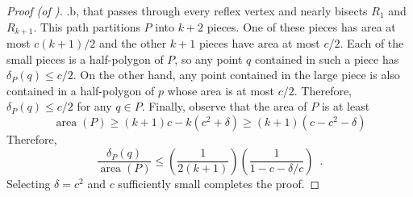 \documentclass{birkjour}
\DeclareMathOperator{\area}{area}
\begin{document}
\begin{proof}[Proof (of )]
.b, that passes through
every reflex vertex and nearly bisects $R_1$ and $R_{k+1}$.  This path
partitions $P$ into $k+2$ pieces.  One of these pieces has area at
most $c(k+1)/2$ and the other $k+1$ pieces have area at most $c/2$.
Each of the small pieces is a half-polygon of $P$, so any point $q$
contained in such a piece has $\delta_P(q)\le c/2$.  On the other
hand, any point contained in the large piece is also contained in a
half-polygon of $p$ whose area is at most $c/2$.  Therefore, 
$\delta_P(q)\le c/2$ for any $q\in P$.  Finally, observe that the area
of $P$ is at least
\[
\area(P) \ge (k+1)c - k(c^2+\delta) \ge (k+1)(c-c^2-\delta)
\]
Therefore, 
\[
\frac{\delta_P(q)}{\area(P)} \le
\left(\frac{1}{2(k+1)}\right)\left(\frac{1}{1-c-\delta/c}\right) \enspace .
\]
Selecting $\delta=c^2$ and $c$ sufficiently small completes the proof.
\end{proof}

%
%
\end{document}
